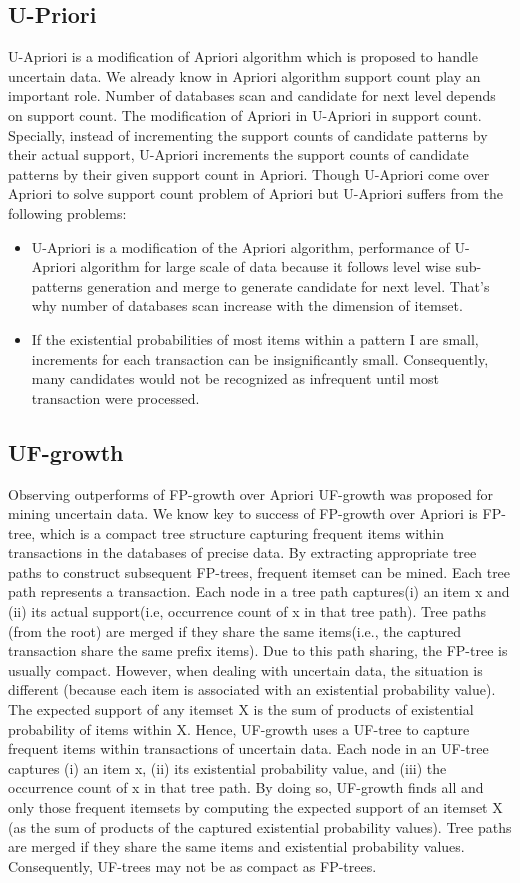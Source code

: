 \subsection{U-Priori}
U-Apriori is a  modification of Apriori algorithm which is proposed to handle uncertain data. We already know in Apriori algorithm support count play an important role. Number of databases scan and candidate for next level depends on support count. The modification of Apriori in U-Apriori in support count. Specially, instead of incrementing the support counts of candidate patterns by their actual support, U-Apriori increments the support counts of candidate patterns by their given support count in Apriori. Though U-Apriori come over Apriori to solve support count problem of Apriori but U-Apriori suffers from the following problems:
\begin{itemize}
 \item U-Apriori is a modification of the Apriori algorithm, performance of U-Apriori algorithm for large scale of data because it follows level wise sub-patterns generation and merge to generate candidate for next level. That's why number of databases scan increase with the dimension of itemset.
  \item If the existential probabilities of most items within a pattern I are small, increments for each transaction can be insignificantly small. Consequently, many candidates would not be recognized as infrequent until most transaction were processed.
\end{itemize}
  
\subsection{UF-growth}
Observing outperforms of FP-growth over Apriori UF-growth was proposed for mining uncertain data. We know key to success of FP-growth over Apriori is FP-tree, which is a compact tree structure capturing frequent items within transactions in the databases of precise data. By extracting appropriate tree paths to construct subsequent FP-trees, frequent itemset can be mined. Each tree path represents a transaction. Each node in a tree path captures(i) an item x and (ii) its actual support(i.e, occurrence count of x in that tree path). Tree paths (from the root) are merged if they share the same items(i.e., the captured transaction share the same prefix items). Due to this path sharing, the FP-tree is usually compact. However, when dealing with uncertain data, the situation is different (because each item is associated with an existential probability value). The expected support of any itemset X is the sum of products of existential probability of items within X. Hence, UF-growth uses a UF-tree to capture frequent items within transactions of uncertain data. Each node in an UF-tree captures (i) an item x, (ii) its existential probability value, and (iii) the occurrence count of x in that tree path. By doing so, UF-growth ﬁnds all and only those frequent itemsets by computing the expected support of an itemset X (as the sum of products of the captured existential probability values). Tree paths are merged if they share the same items and existential probability values. Consequently, UF-trees may not be as compact as FP-trees.

